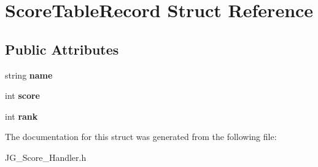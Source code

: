 \hypertarget{struct_score_table_record}{\section{Score\-Table\-Record Struct Reference}
\label{struct_score_table_record}
}
\subsection*{Public Attributes}
\begin{DoxyCompactItemize}
\item 
\hypertarget{struct_score_table_record_a55b55dde6a43ce872aaa1cca88528c35}{string {\bfseries name}}\label{struct_score_table_record_a55b55dde6a43ce872aaa1cca88528c35}

\item 
\hypertarget{struct_score_table_record_a8cf8a756ffefaf10e38fa8a6e430e270}{int {\bfseries score}}\label{struct_score_table_record_a8cf8a756ffefaf10e38fa8a6e430e270}

\item 
\hypertarget{struct_score_table_record_ae1a14feca0c0ed9bbc8913f38abc634d}{int {\bfseries rank}}\label{struct_score_table_record_ae1a14feca0c0ed9bbc8913f38abc634d}

\end{DoxyCompactItemize}


The documentation for this struct was generated from the following file\-:\begin{DoxyCompactItemize}
\item 
J\-G\-\_\-\-Score\-\_\-\-Handler.\-h\end{DoxyCompactItemize}
